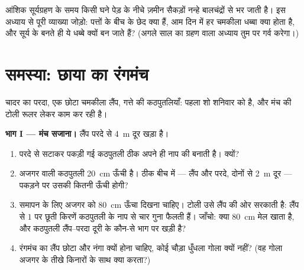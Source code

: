 \begin{exercise}[$\star\star\star$]\label{exo:g6:light-propagation:12}
आंशिक सूर्यग्रहण के समय किसी घने पेड़ के नीचे ज़मीन सैकड़ों नन्हे
बालचंद्रों से भर जाती है। इस अध्याय से पूरी व्याख्या जोड़ो: पत्तों के
बीच के छेद क्या हैं, आम दिन में हर चमकीला धब्बा क्या होता है, और
सूर्य के  बनते ही ये धब्बे  क्यों बन जाते हैं? (अगले
साल का ग्रहण वाला अध्याय तुम पर गर्व करेगा।)
\end{exercise}

\section{समस्या: छाया का रंगमंच}

\begin{problem}\label{pb:g6:light-propagation:1}
चादर का परदा, एक छोटा चमकीला लैंप, गत्ते की कठपुतलियाँ: पहला शो शनिवार
को है, और मंच की टोली रूलर लेकर काम कर रही है।

\medskip\noindent\textbf{भाग I --- मंच सजाना।}
लैंप परदे से \qty{4}{m} दूर खड़ा है।
\begin{enumerate}
  \item परदे से सटाकर पकड़ी गई कठपुतली ठीक अपने ही नाप की  बनाती
        है। क्यों?
  \item अजगर वाली कठपुतली \qty{20}{cm} ऊँची है। ठीक बीच में ---
        लैंप और परदे, दोनों से \qty{2}{m} दूर --- पकड़ने पर उसकी
         कितनी ऊँची होगी?
  \item समापन के लिए अजगर को \qty{80}{cm} ऊँचा दिखना चाहिए। टोली उसे
        लैंप की ओर सरकाती है: लैंप से $1$  पर छूती किरणें
        कठपुतली के नाप से चार गुना फैलती हैं। जाँचो: क्या
        \qty{80}{cm} मेल खाता है, और कठपुतली लैंप--परदा दूरी के
        कौन-से भाग पर खड़ी है?
  \item रंगमंच का लैंप छोटा और नंगा क्यों होना चाहिए, कोई चौड़ा
        धुँधला गोला क्यों नहीं? (वह गोला अजगर के तीखे किनारों के साथ
        क्या करता?)
\end{enumerate}


\end{problem}
